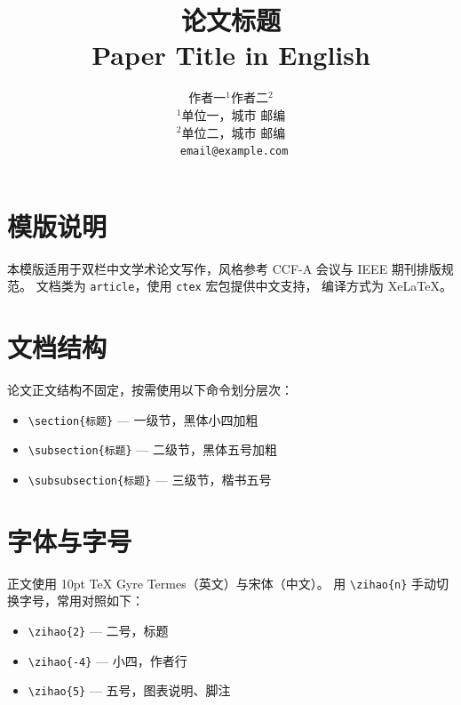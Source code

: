 \documentclass[10pt, twocolumn, a4paper]{article}
\title{
  \vspace{-1em}
  {\heiti\zihao{2} 论文标题}\\[4pt]
  {\zihao{-4} Paper Title in English}
}
\author{
  \zihao{-4}
  作者一$^{1}$\quad 作者二$^{2}$\\[2pt]
  \zihao{5}
  $^{1}$单位一，城市 邮编\\
  $^{2}$单位二，城市 邮编\\[2pt]
  \texttt{\zihao{5} email@example.com}
}
\date{}
\begin{document}
\maketitle
\thispagestyle{fancy}

\section{模版说明}

本模版适用于双栏中文学术论文写作，风格参考 CCF-A 会议与 IEEE 期刊排版规范。
文档类为 \texttt{article}，使用 \texttt{ctex} 宏包提供中文支持，
编译方式为 XeLaTeX。

\section{文档结构}

论文正文结构不固定，按需使用以下命令划分层次：

\begin{itemize}
  \item \verb|\section{标题}| — 一级节，黑体小四加粗
  \item \verb|\subsection{标题}| — 二级节，黑体五号加粗
  \item \verb|\subsubsection{标题}| — 三级节，楷书五号
\end{itemize}

\section{字体与字号}

正文使用 10pt TeX Gyre Termes（英文）与宋体（中文）。
用 \verb|\zihao{n}| 手动切换字号，常用对照如下：

\begin{itemize}
  \item \verb|\zihao{2}| — 二号，标题
  \item \verb|\zihao{-4}| — 小四，作者行
  \item \verb|\zihao{5}| — 五号，图表说明、脚注
\end{itemize}
\end{document}
